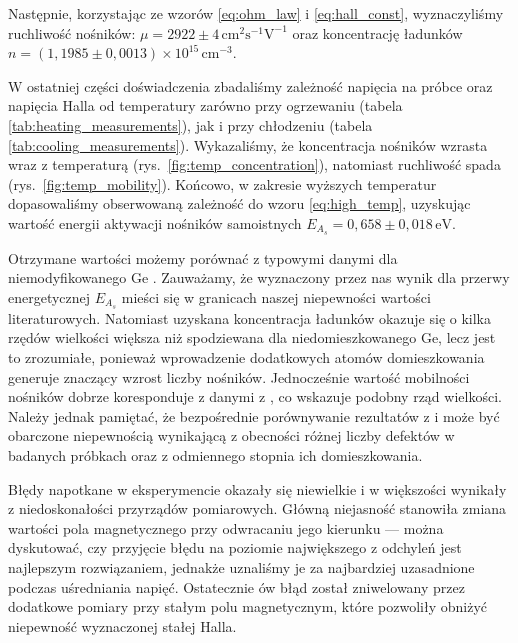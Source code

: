 \documentclass[12pt]{article}
\begin{document}
Następnie, korzystając ze wzorów \eqref{eq:ohm_law} i \eqref{eq:hall_const}, wyznaczyliśmy ruchliwość nośników: $\mu = 2922 \pm 4\,\mathrm{cm}^2\mathrm{s}^{-1}\mathrm{V}^{-1}$ oraz koncentrację ładunków $n = (1{,}1985 \pm 0{,}0013)\times 10^{15}\,\mathrm{cm}^{-3}$.

W ostatniej części doświadczenia zbadaliśmy zależność napięcia na próbce oraz napięcia Halla od temperatury zarówno przy ogrzewaniu (tabela \ref{tab:heating_measurements}), jak i przy chłodzeniu (tabela \ref{tab:cooling_measurements}). Wykazaliśmy, że koncentracja nośników wzrasta wraz z temperaturą (rys.~\ref{fig:temp_concentration}), natomiast ruchliwość spada (rys.~\ref{fig:temp_mobility}). Końcowo, w zakresie wyższych temperatur dopasowaliśmy obserwowaną zależność do wzoru \eqref{eq:high_temp}, uzyskując wartość energii aktywacji nośników samoistnych $E_{A_s} = 0{,}658 \pm 0{,}018\,\mathrm{eV}$.  

Otrzymane wartości możemy porównać z typowymi danymi dla niemodyfikowanego Ge \cite{band_gap}. Zauważamy, że wyznaczony przez nas wynik dla przerwy energetycznej $E_{A_s}$ mieści się w granicach naszej niepewności wartości literaturowych. Natomiast uzyskana koncentracja ładunków okazuje się o kilka rzędów wielkości większa niż spodziewana dla niedomieszkowanego Ge, lecz jest to zrozumiałe, ponieważ wprowadzenie dodatkowych atomów domieszkowania generuje znaczący wzrost liczby nośników.
Jednocześnie wartość mobilności nośników dobrze koresponduje z danymi z \cite{electric_ge}, co wskazuje podobny rząd wielkości. Należy jednak pamiętać, że bezpośrednie porównywanie rezultatów z \cite{band_gap} i \cite{electric_ge} może być obarczone niepewnością wynikającą z obecności różnej liczby defektów w badanych próbkach oraz z odmiennego stopnia ich domieszkowania.

Błędy napotkane w eksperymencie okazały się niewielkie i w większości wynikały z niedoskonałości przyrządów pomiarowych. Główną niejasność stanowiła zmiana wartości pola magnetycznego przy odwracaniu jego kierunku — można dyskutować, czy przyjęcie błędu na poziomie największego z odchyleń jest najlepszym rozwiązaniem, jednakże uznaliśmy je za najbardziej uzasadnione podczas uśredniania napięć. Ostatecznie ów błąd został zniwelowany przez dodatkowe pomiary przy stałym polu magnetycznym, które pozwoliły obniżyć niepewność wyznaczonej stałej Halla.

\newpage
\end{document}
